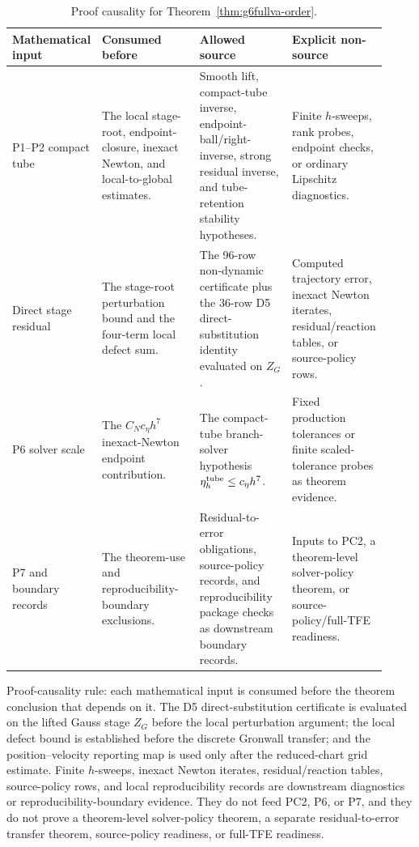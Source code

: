 \documentclass[preprint,12pt]{elsarticle}
\newcommand{\tfe}{TFE}
\begin{document}
\begin{table}[htbp]
\centering
\caption{Proof causality for Theorem~\ref{thm:g6fullva-order}.}
\label{tab:proof-causality-ledger}
\scriptsize
\setlength{\tabcolsep}{2pt}
\renewcommand{\arraystretch}{0.92}
\begin{tabular}{P{0.16\linewidth}P{0.30\linewidth}P{0.28\linewidth}P{0.18\linewidth}}
\toprule
Mathematical input & Consumed before & Allowed source & Explicit non-source \\
\midrule
P1--P2 compact tube &
The local stage-root, endpoint-closure, inexact Newton, and
local-to-global estimates. &
Smooth lift, compact-tube inverse, endpoint-ball/right-inverse, strong
residual inverse, and tube-retention stability hypotheses. &
Finite \(h\)-sweeps, rank probes, endpoint checks, or ordinary Lipschitz
diagnostics. \\
Direct stage residual &
The stage-root perturbation bound and the four-term local defect sum. &
The 96-row non-dynamic certificate plus the 36-row D5 direct-substitution
identity evaluated on \(Z_G\). &
Computed trajectory error, inexact Newton iterates, residual/reaction tables,
or source-policy rows. \\
P6 solver scale &
The \(C_Nc_\eta h^7\) inexact-Newton endpoint contribution. &
The compact-tube branch-solver hypothesis
\(\eta_h^{\rm tube}\le c_\eta h^7\). &
Fixed production tolerances or finite scaled-tolerance probes as theorem
evidence. \\
P7 and boundary records &
The theorem-use and reproducibility-boundary exclusions. &
Residual-to-error obligations, source-policy records, and reproducibility package
checks as downstream boundary records. &
Inputs to PC2, a theorem-level solver-policy theorem, or source-policy/full-\tfe{}
readiness. \\
\bottomrule
\end{tabular}
\end{table}

Proof-causality rule: each mathematical input is consumed
before the theorem conclusion that depends on it. The D5 direct-substitution
certificate is evaluated on the lifted Gauss stage \(Z_G\) before the local
perturbation argument; the local defect bound is established before the
discrete Gronwall transfer; and the position--velocity reporting map is used
only after the reduced-chart grid estimate. Finite \(h\)-sweeps, inexact
Newton iterates, residual/reaction tables, source-policy rows, and local
reproducibility records are downstream diagnostics or reproducibility-boundary
evidence. They do not
feed PC2, P6, or P7, and they do not prove a theorem-level
solver-policy theorem, a separate residual-to-error transfer theorem,
source-policy readiness, or full-TFE readiness.
\end{document}
